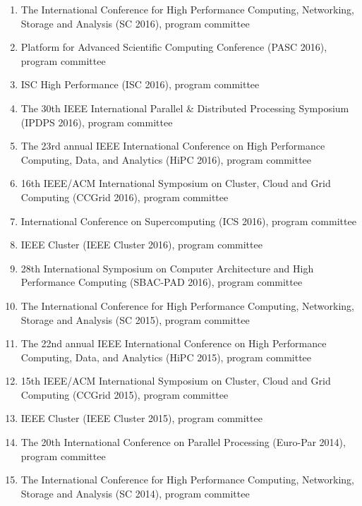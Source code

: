\documentclass[margin,line]{cv}
\begin{document}
\begin{resume}
\begin{enumerate}
\item The International Conference for High Performance Computing, Networking, Storage and Analysis (SC 2016), program committee

\item Platform for Advanced Scientific Computing Conference (PASC 2016), program committee

\item ISC High Performance (ISC 2016), program committee

\item The 30th IEEE International Parallel \& Distributed Processing Symposium (IPDPS 2016), program committee

\item The 23rd annual IEEE International Conference on High Performance Computing, Data, and Analytics (HiPC 2016), program committee

\item 16th IEEE/ACM International Symposium on Cluster, Cloud and Grid Computing (CCGrid 2016), program committee

\item International Conference on Supercomputing (ICS 2016), program committee

\item IEEE Cluster (IEEE Cluster 2016), program committee

\item 28th International Symposium on Computer Architecture and High Performance Computing (SBAC-PAD 2016), program committee

\item The International Conference for High Performance Computing, Networking, Storage and Analysis (SC 2015), program committee

\item The 22nd annual IEEE International Conference on High Performance Computing, Data, and Analytics (HiPC 2015), program committee

\item 15th IEEE/ACM International Symposium on Cluster, Cloud and Grid Computing (CCGrid 2015), program committee

\item IEEE Cluster (IEEE Cluster 2015), program committee

\item The 20th International Conference on Parallel Processing (Euro-Par 2014), program committee

\item The International Conference for High Performance Computing, Networking, Storage and Analysis (SC 2014), program committee


\end{enumerate}
\end{resume}
\end{document}
